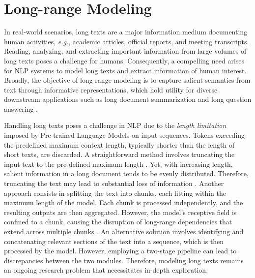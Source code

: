 \chapter{Long-range Modeling}
\label{chapter:related-long-range-modeling}


\renewcommand{\leftmark}{\spacedlowsmallcaps{Long-range Modeling}}


\minitoc



In real-world scenarios, long texts are a major information medium documenting human activities, \textit{e.g.}, academic articles, official reports, and meeting transcripts. Reading, analyzing, and extracting important information from large volumes of long texts poses a challenge for humans. Consequently, a compelling need arises for \ac{NLP} systems to model long texts and extract information of human interest. Broadly, the objective of long-range modeling is to capture salient semantics from text through informative representations, which hold utility for diverse downstream applications such as long document summarization \citep{cohan2018discourse, sharma2019bigpatent} and long question answering \citep{dasigi2021dataset}.
 
Handling long texts poses a challenge in \ac{NLP} due to the \textit{length limitation} imposed by Pre-trained Language Models on input sequences. Tokens exceeding the predefined maximum context length, typically shorter than the length of short texts, are discarded. A straightforward method involves truncating the input text to the pre-defined maximum length \citep{lewis2019bart}. Yet, with increasing length, salient information in a long document tends to be evenly distributed. Therefore, truncating the text may lead to substantial loss of information \citep{koh2022empirical}. Another approach consists in splitting the text into chunks, each fitting within the maximum length of the model. Each chunk is processed independently, and the resulting outputs are then aggregated. However, the model's receptive field is confined to a chunk, causing the disruption of long-range dependencies that extend across multiple chunks \citep{ding2020cogltx}. An alternative solution involves identifying and concatenating relevant sections of the text into a sequence, which is then processed by the model. However, employing a two-stage pipeline can lead to discrepancies between the two modules.
Therefore, modeling long texts remains an ongoing research problem that necessitates in-depth exploration.

